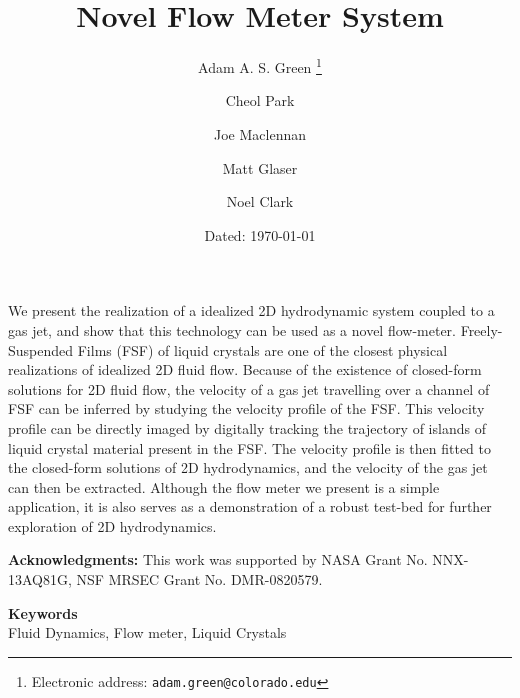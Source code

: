 \documentclass{article} %
\date{} %
\def\keywords#1{\begin{center}{\bf Keywords}\\{#1}\end{center}} %
\begin{document}
\title{Novel Flow Meter System}

\author{Adam A. S. Green%
\thanks{Electronic address: \texttt{adam.green@colorado.edu}}}
\author{Cheol Park}
\author{Joe Maclennan}
\author{Matt Glaser}
\author{Noel Clark}

 
\date{Dated: \today}

\maketitle

\thispagestyle{empty}



\begin{doublespace}
\noindent We present the realization of a idealized 2D hydrodynamic system
coupled to a
gas jet, and show that this technology can be used as a novel flow-meter.
Freely-Suspended Films (FSF) of liquid crystals are one of the closest physical realizations of
idealized 2D fluid flow. Because of the  existence of closed-form solutions for 2D
fluid flow, the velocity of a gas jet travelling over a channel of FSF can be
inferred by studying the velocity profile of the FSF. This velocity profile can be
directly imaged by digitally tracking the trajectory of islands of liquid
crystal material present in the FSF. The velocity profile is then fitted to the
closed-form solutions of 2D hydrodynamics, and the velocity of the gas jet can
then be extracted. Although the flow meter we present is a simple
application, it is also serves as a demonstration
of a robust test-bed for further exploration of 2D hydrodynamics.
\end{doublespace}
\textbf{Acknowledgments:} This work was supported by NASA Grant No. NNX-13AQ81G,
NSF MRSEC Grant No. DMR-0820579.

\vspace{20 mm}

\keywords{Fluid Dynamics, Flow meter, Liquid Crystals} %


                    
\end{document}
